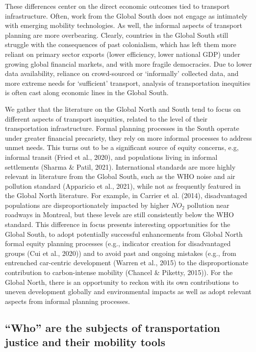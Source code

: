 \documentclass[
  letterpaper,
  DIV=11,
  numbers=noendperiod]{scrartcl}
\begin{document}
These differences center on the direct economic outcomes tied to
transport infrastructure. Often, work from the Global South does not
engage as intimately with emerging mobility technologies. As well, the
informal aspects of transport planning are more overbearing. Clearly,
countries in the Global South still struggle with the consequences of
past colonialism, which has left them more reliant on primary sector
exports (lower efficiency, lower national GDP) under growing global
financial markets, and with more fragile democracies. Due to lower data
availability, reliance on crowd-sourced or `informally' collected data,
and more extreme needs for `sufficient' transport, analysis of
transportation inequities is often cast along economic lines in the
Global South.

We gather that the literature on the Global North and South tend to
focus on different aspects of transport inequities, related to the level
of their transportation infrastructure. Formal planning processes in the
South operate under greater financial precariety, they rely on more
informal processes to address unmet needs. This turns out to be a
significant source of equity concerns, e.g, informal transit (Fried et
al., 2020), and populations living in informal settlements (Sharma \&
Patil, 2021). International standards are more highly relevant in
literature from the Global South, such as the WHO noise and air
pollution standard (Apparicio et al., 2021), while not as frequently
featured in the Global North literature. For example, in Carrier et al.
(2014), disadvantaged populations are disproportionately impacted by
higher \(NO_2\) pollution near roadways in Montreal, but these levels
are still consistently below the WHO standard. This difference in focus
presents interesting opportunities for the Global South, to adopt
potentially successful enhancements from Global North formal equity
planning processes (e.g., indicator creation for disadvantaged groups
(Cui et al., 2020)) and to avoid past and ongoing mistakes (e.g., from
entrenched car-centric development (Warren et al., 2015) to the
disproportionate contribution to carbon-intense mobility (Chancel \&
Piketty, 2015)). For the Global North, there is an opportunity to reckon
with its own contributions to uneven development globally and
environmental impacts as well as adopt relevant aspects from informal
planning processes.

\subsection{``Who'' are the subjects of transportation justice and their
mobility
tools}\label{who-are-the-subjects-of-transportation-justice-and-their-mobility-tools}
\end{document}
